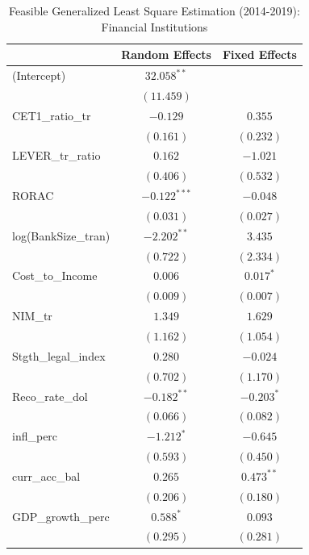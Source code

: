 
\begin{table}
\caption{Feasible Generalized Least Square Estimation (2014-2019): Financial Institutions}
\begin{center}
\begin{tabular}{l c c}
\hline
 & Random Effects & Fixed Effects \\
\hline
(Intercept)         & $32.058^{**}$  &              \\
                    & $(11.459)$     &              \\
CET1\_ratio\_tr     & $-0.129$       & $0.355$      \\
                    & $(0.161)$      & $(0.232)$    \\
LEVER\_tr\_ratio    & $0.162$        & $-1.021$     \\
                    & $(0.406)$      & $(0.532)$    \\
RORAC               & $-0.122^{***}$ & $-0.048$     \\
                    & $(0.031)$      & $(0.027)$    \\
log(BankSize\_tran) & $-2.202^{**}$  & $3.435$      \\
                    & $(0.722)$      & $(2.334)$    \\
Cost\_to\_Income    & $0.006$        & $0.017^{*}$  \\
                    & $(0.009)$      & $(0.007)$    \\
NIM\_tr             & $1.349$        & $1.629$      \\
                    & $(1.162)$      & $(1.054)$    \\
Stgth\_legal\_index & $0.280$        & $-0.024$     \\
                    & $(0.702)$      & $(1.170)$    \\
Reco\_rate\_dol     & $-0.182^{**}$  & $-0.203^{*}$ \\
                    & $(0.066)$      & $(0.082)$    \\
infl\_perc          & $-1.212^{*}$   & $-0.645$     \\
                    & $(0.593)$      & $(0.450)$    \\
curr\_acc\_bal      & $0.265$        & $0.473^{**}$ \\
                    & $(0.206)$      & $(0.180)$    \\
GDP\_growth\_perc   & $0.588^{*}$    & $0.093$      \\
                    & $(0.295)$      & $(0.281)$    \\

\end{tabular}
\end{center}
\end{table}
